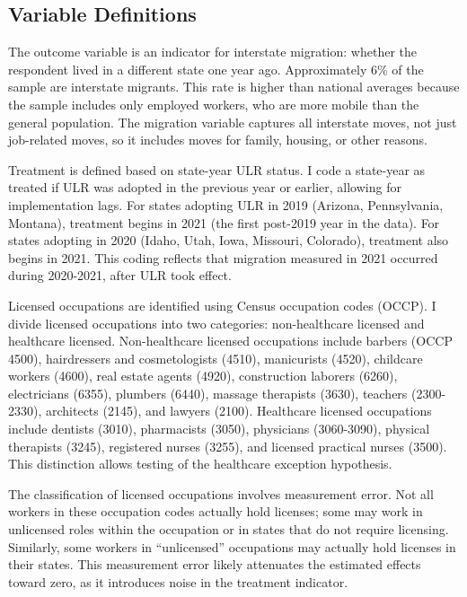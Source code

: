 \documentclass[12pt]{article}
\begin{document}
\subsection{Variable Definitions}

The outcome variable is an indicator for interstate migration: whether the respondent lived in a different state one year ago. Approximately 6\% of the sample are interstate migrants. This rate is higher than national averages because the sample includes only employed workers, who are more mobile than the general population. The migration variable captures all interstate moves, not just job-related moves, so it includes moves for family, housing, or other reasons.

Treatment is defined based on state-year ULR status. I code a state-year as treated if ULR was adopted in the previous year or earlier, allowing for implementation lags. For states adopting ULR in 2019 (Arizona, Pennsylvania, Montana), treatment begins in 2021 (the first post-2019 year in the data). For states adopting in 2020 (Idaho, Utah, Iowa, Missouri, Colorado), treatment also begins in 2021. This coding reflects that migration measured in 2021 occurred during 2020-2021, after ULR took effect.

Licensed occupations are identified using Census occupation codes (OCCP). I divide licensed occupations into two categories: non-healthcare licensed and healthcare licensed. Non-healthcare licensed occupations include barbers (OCCP 4500), hairdressers and cosmetologists (4510), manicurists (4520), childcare workers (4600), real estate agents (4920), construction laborers (6260), electricians (6355), plumbers (6440), massage therapists (3630), teachers (2300-2330), architects (2145), and lawyers (2100). Healthcare licensed occupations include dentists (3010), pharmacists (3050), physicians (3060-3090), physical therapists (3245), registered nurses (3255), and licensed practical nurses (3500). This distinction allows testing of the healthcare exception hypothesis.

The classification of licensed occupations involves measurement error. Not all workers in these occupation codes actually hold licenses; some may work in unlicensed roles within the occupation or in states that do not require licensing. Similarly, some workers in ``unlicensed'' occupations may actually hold licenses in their states. This measurement error likely attenuates the estimated effects toward zero, as it introduces noise in the treatment indicator.
\end{document}
